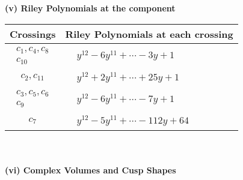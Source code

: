 \documentclass[1p]{elsarticle_modified}
\theoremstyle{definition}
\begin{document}
\newpage\renewcommand{\arraystretch}{1}
\flushleft \textbf{(v) Riley Polynomials at the component}\newline \\
\begin{tabular}{m{50pt}|m{274pt}}
Crossings & \hspace{64pt}Riley Polynomials at each crossing \\
\hline $$\begin{aligned}c_{1},c_{4},c_{8}\\c_{10}\end{aligned}$$&$\begin{aligned}
&y^{12}-6 y^{11}+\cdots-3 y+1
\end{aligned}$\\
\hline $$\begin{aligned}c_{2},c_{11}\end{aligned}$$&$\begin{aligned}
&y^{12}+2 y^{11}+\cdots+25 y+1
\end{aligned}$\\
\hline $$\begin{aligned}c_{3},c_{5},c_{6}\\c_{9}\end{aligned}$$&$\begin{aligned}
&y^{12}-6 y^{11}+\cdots-7 y+1
\end{aligned}$\\
\hline $$\begin{aligned}c_{7}\end{aligned}$$&$\begin{aligned}
&y^{12}-5 y^{11}+\cdots-112 y+64
\end{aligned}$\\
\hline
\end{tabular}\\~\\
\newpage\flushleft \textbf{(vi) Complex Volumes and Cusp Shapes}
\end{document}
